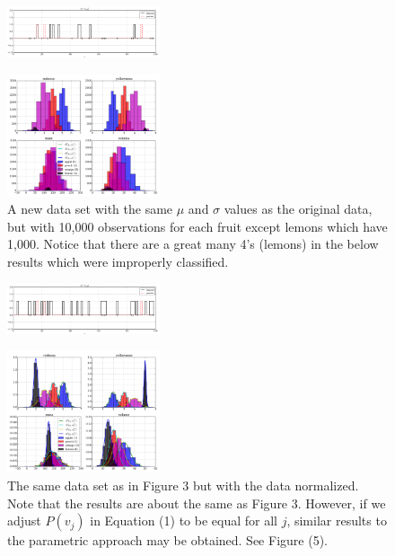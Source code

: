 \begin{multicols}{2}
\begin{figure}[H]
  \centering
		\includegraphics[width=0.4\textwidth]{images/normed_original_results.png}
\end{figure}

\end{multicols}
\begin{multicols}{2}

\begin{figure}[H]
  \centering
		\includegraphics[width=0.4\textwidth]{images/not_normed_new.png}
  \caption{\scriptsize A new data set with the same $\mu$ and $\sigma$ values as the original data, but with 10,000 observations for each fruit except lemons which have 1,000.  Notice that there are a great many 4's (lemons) in the below results which were improperly classified.}
\end{figure}

\begin{figure}[H]
  \centering
		\includegraphics[width=0.4\textwidth]{images/not_normed_new_results.png}
\end{figure}

\begin{figure}[H]
  \centering
		\includegraphics[width=0.4\textwidth]{images/normed_new.png}
  \caption{\scriptsize The same data set as in Figure 3 but with the data normalized.  Note that the results are about the same as Figure 3.  However, if we adjust $P(v_j)$ in Equation (1) to be equal for all $j$, similar results to the parametric approach may be obtained.  See Figure (5).}
\end{figure}


\end{multicols}
